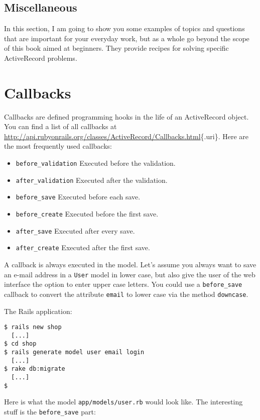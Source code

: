 \documentclass[a4paper]{book}
\newcommand{\chap}[1]{\newpage\thispagestyle{empty}\chapter{#1}\label{chap:\thechapter}}
\begin{document}
\section{Miscellaneous}\label{miscellaneous-2}

In this section, I am going to show you some examples of topics and questions that are important for your everyday work, but as a whole go beyond the scope of this book aimed at beginners. They provide recipes for solving specific ActiveRecord problems.

\chap{Callbacks}\label{callbacks}

Callbacks are defined programming hooks in the life of an ActiveRecord object. You can find a list of all callbacks at \url{http://api.rubyonrails.org/classes/ActiveRecord/Callbacks.html}\{.uri\}. Here are the most frequently used callbacks:

\begin{itemize}
\itemsep1pt\parskip0pt
\item
  \texttt{before\_validation} Executed before the validation.
\item
  \texttt{after\_validation} Executed after the validation.
\item
  \texttt{before\_save} Executed before each save.
\item
  \texttt{before\_create} Executed before the first save.
\item
  \texttt{after\_save} Executed after every save.
\item
  \texttt{after\_create} Executed after the first save.
\end{itemize}

A callback is always executed in the model. Let's assume you always want to save an e-mail address in a \texttt{User} model in lower case, but also give the user of the web interface the option to enter upper case letters. You could use a \texttt{before\_save} callback to convert the attribute \texttt{email} to lower case via the method \texttt{downcase}.

The Rails application:

\begin{shaded}\begin{verbatim}
$ rails new shop
  [...]
$ cd shop
$ rails generate model user email login
  [...]
$ rake db:migrate
  [...]
$
\end{verbatim}\end{shaded}

Here is what the model \texttt{app/models/user.rb} would look like. The interesting stuff is the \texttt{before\_save} part:
\end{document}
